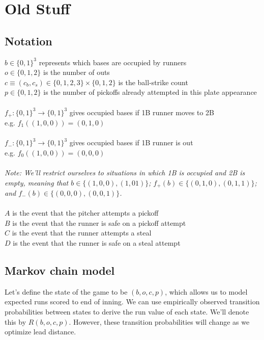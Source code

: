 \documentclass{article}
\begin{document}
  \newpage

  \section{Old Stuff}
  
    \subsection{Notation}
  
    $b \in \{0, 1\}^3$ represents which bases are occupied by runners\\
    $o \in \{0, 1, 2\}$ is the number of outs\\
    $c \equiv (c_b, c_s) \in \{0, 1, 2, 3\} \times \{0, 1, 2\}$ is the ball-strike count\\
    $p \in \{0, 1, 2\}$ is the number of pickoffs already attempted in this plate appearance\\
    ~\\
    $f_+: \{0, 1\}^3 \rightarrow \{0, 1\}^3$ gives occupied bases if 1B runner moves to 2B\\
    \indent e.g. $f_1((1, 0, 0)) = (0, 1, 0)$\\
    ~\\
    $f_-: \{0, 1\}^3 \rightarrow \{0, 1\}^3$ gives occupied bases if 1B runner is out\\
    \indent e.g. $f_0((1, 0, 0)) = (0, 0, 0)$\\
    ~\\
    {\it
      Note: We'll restrict ourselves to situations in which 1B is occupied and 2B is empty, meaning that $b \in \{(1, 0, 0), (1, 0 1)\}$; $f_+(b) \in \{(0, 1, 0), (0, 1, 1)\}$; and $f_-(b) \in \{(0, 0, 0), (0, 0, 1)\}$.
    }\\
    ~\\
    $A$ is the event that the pitcher attempts a pickoff\\
    $B$ is the event that the runner is safe on a pickoff attempt\\
    $C$ is the event that the runner attempts a steal\\
    $D$ is the event that the runner is safe on a steal attempt
  
    \subsection{Markov chain model}
  
    Let's define the state of the game to be $(b, o, c, p)$, which allows us to model expected runs scored to end of inning. We can use empirically observed transition probabilities between states to derive the run value of each state. We'll denote this by $R(b, o, c, p)$. However, these transition probabilities will change as we optimize lead distance.
  
\end{document}
